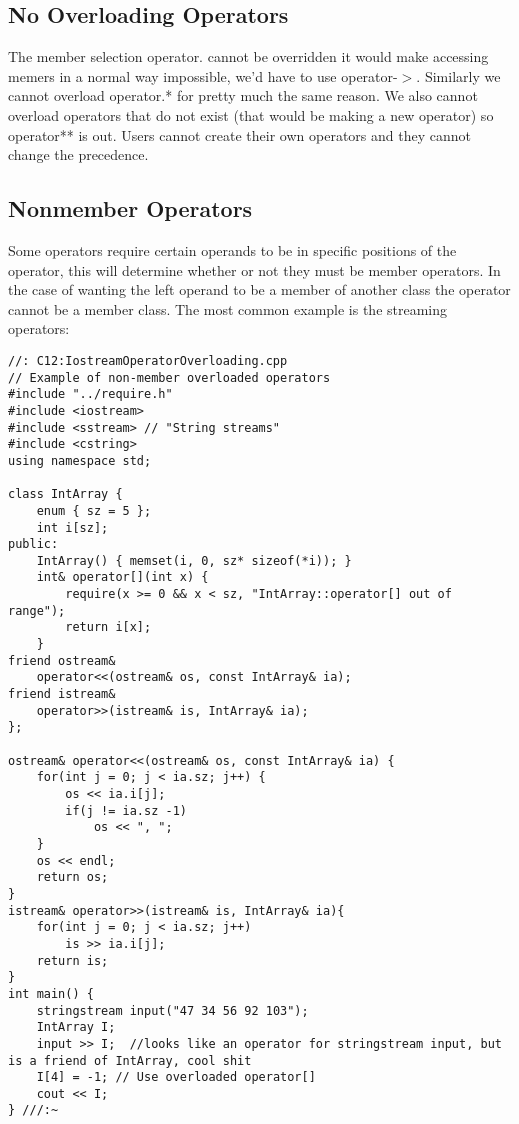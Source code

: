 \documentclass[12pt]{article}
\begin{document}
\subsection*{No Overloading Operators}
The member selection operator. cannot be overridden it would make accessing memers in a normal way impossible, we'd have to use operator-$>$. Similarly we cannot overload operator.* for pretty much the same reason. We also cannot overload operators that do not exist (that would be making a new operator) so operator** is out. Users cannot create their own operators and they cannot change the precedence.

\subsection*{Nonmember Operators}
Some operators require certain operands to be in specific positions of the operator, this will determine whether or not they must be member operators. In the case of wanting the left operand to be a member of another class the operator cannot be a member class. The most common example is the streaming operators:
\begin{lstlisting}
//: C12:IostreamOperatorOverloading.cpp
// Example of non-member overloaded operators
#include "../require.h"
#include <iostream>
#include <sstream> // "String streams"
#include <cstring>
using namespace std;

class IntArray {
    enum { sz = 5 };
    int i[sz];
public:
    IntArray() { memset(i, 0, sz* sizeof(*i)); }
    int& operator[](int x) {
        require(x >= 0 && x < sz, "IntArray::operator[] out of range");
        return i[x];
    }
friend ostream&
    operator<<(ostream& os, const IntArray& ia);
friend istream&
    operator>>(istream& is, IntArray& ia);
};

ostream& operator<<(ostream& os, const IntArray& ia) {
    for(int j = 0; j < ia.sz; j++) {
        os << ia.i[j];
        if(j != ia.sz -1)
            os << ", ";
    }
    os << endl;
    return os;
}
istream& operator>>(istream& is, IntArray& ia){
    for(int j = 0; j < ia.sz; j++)
        is >> ia.i[j];
    return is;
}
int main() {
    stringstream input("47 34 56 92 103");
    IntArray I;
    input >> I;  //looks like an operator for stringstream input, but is a friend of IntArray, cool shit
    I[4] = -1; // Use overloaded operator[]
    cout << I;
} ///:~
\end{lstlisting}
\end{document}
